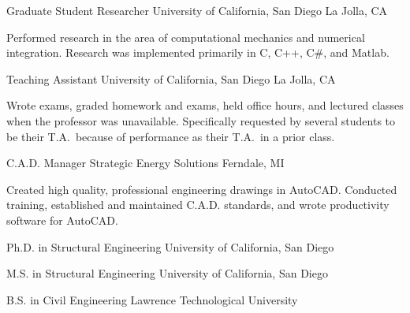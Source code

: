 \documentclass{resume}
\begin{document}
            {Graduate Student Researcher}
            {University of California, San Diego}
			{La Jolla, CA}
			
					\vspace*{-6pt}
					\noindent 
				Performed research in the area of computational mechanics and numerical integration.  Research was implemented
				primarily in C, C++, C\#, and Matlab.
			\hspace*{0pt}\\ \vspace*{-2pt}
				
            {Teaching Assistant}
            {University of California, San Diego}
			{La Jolla, CA}
			
					\vspace*{-6pt}
					\noindent 
				Wrote exams, graded homework and exams, held office hours, and lectured classes when the professor
				was unavailable.  Specifically requested by several students to be their T.A.\ because of
				performance as their T.A.\ in a prior class.
			\hspace*{0pt}\\ \vspace*{-2pt}
				
            {C.A.D. Manager}
            {Strategic Energy Solutions}
			{Ferndale, MI}
			
					\vspace*{-6pt}
					\noindent 
				Created high quality, professional engineering drawings in AutoCAD.  Conducted training, established
				and maintained C.A.D. standards, and wrote productivity software for AutoCAD.
			\hspace*{0pt}\\ \vspace*{-2pt}
				
		\vspace*{-8pt}
	

	
                {Ph.D. in Structural Engineering}
                {University of California, San Diego}
		
                {M.S. in Structural Engineering}
                {University of California, San Diego}
		
                {B.S. in Civil Engineering}
                {Lawrence Technological University}
		
\end{document}

